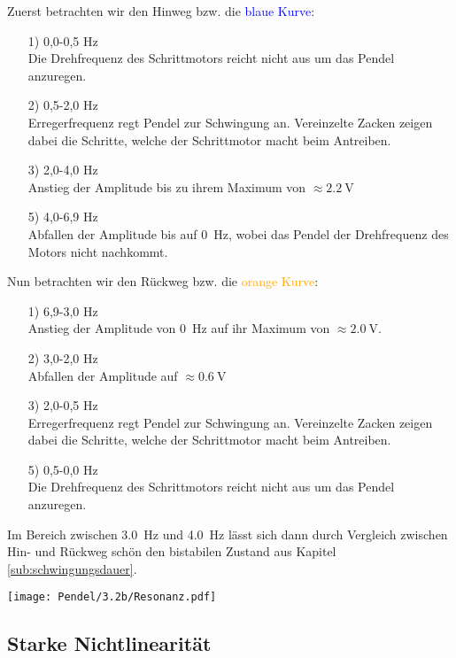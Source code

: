 Zuerst betrachten wir den Hinweg bzw. die \textcolor{blue}{blaue Kurve}:
\begin{itemize}
    \item[1)]0,0-0,5 Hz\\Die Drehfrequenz des Schrittmotors reicht nicht aus um das Pendel anzuregen.
    \item[2)]0,5-2,0 Hz\\Erregerfrequenz regt Pendel zur Schwingung an. Vereinzelte Zacken zeigen dabei die Schritte, welche der Schrittmotor macht beim Antreiben.
    \item[3)]2,0-4,0 Hz\\Anstieg der Amplitude bis zu ihrem Maximum von $\approx\SI{2,2}{\volt}$
    \item[5)]4,0-6,9 Hz\\Abfallen der Amplitude bis auf \SI{0}{\hertz}, wobei das Pendel der Drehfrequenz des Motors nicht nachkommt.\\
\end{itemize}

Nun betrachten wir den Rückweg bzw. die \textcolor{orange}{orange Kurve}:
\begin{itemize}
    \item[1)]6,9-3,0 Hz\\Anstieg der Amplitude von \SI{0}{\hertz} auf ihr Maximum von $\approx\SI{2,0}{\volt}$.
    \item[2)]3,0-2,0 Hz\\Abfallen der Amplitude auf $\approx\SI{0,6}{\volt}$ 
    \item[3)]2,0-0,5 Hz\\Erregerfrequenz regt Pendel zur Schwingung an. Vereinzelte Zacken zeigen dabei die Schritte, welche der Schrittmotor macht beim Antreiben.
    \item[5)]0,5-0,0 Hz\\Die Drehfrequenz des Schrittmotors reicht nicht aus um das Pendel anzuregen.\\
\end{itemize}
Im Bereich zwischen \SI{3,0}{\hertz} und \SI{4,0}{\hertz} lässt sich dann durch Vergleich zwischen Hin- und Rückweg schön den bistabilen Zustand aus Kapitel \ref{sub:schwingungsdauer}.
\newpage
\begin{center}
    \texttt{[image: Pendel/3.2b/Resonanz.pdf]}
    \label{image:resonanz}
\end{center}
\newpage

\subsection{Starke Nichtlinearität}
\label{sub:AuswertungstrongLin}
